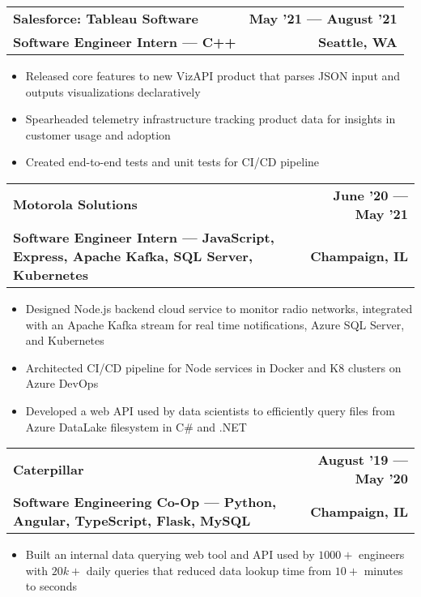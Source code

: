\documentclass[letterpaper,11pt]{article}
\makeatletter
\newcommand{\resumeItem}[1]{
  \item\small{
    {#1 \vspace{-1pt}}
  }
}
\newcommand{\resumeSubheadingSmall}[4]{
  \vspace{-0pt}
  \item
    \begin{tabular*}{1\textwidth}[t]{l@{\extracolsep{\fill}}r}
      \large{\textbf{#1}} & \small{\color{main}\textbf{#2}} \\
      \color{secondary}\textbf{\footnotesize#3} & \color{secondary}\textbf{\footnotesize#4} \\
    \end{tabular*}\vspace{-7pt}
}
\newcommand{\resumeSubSubheading}[2]{
    \item
    \begin{tabular*}{0.97\textwidth}{l@{\extracolsep{\fill}}r}
      \textit{\small#1} & \textit{\small #2} \\
    \end{tabular*}\vspace{-7pt}
}
\newcommand{\resumeSubHeadingListEnd}{\end{itemize}}
\newcommand{\resumeItemListStart}{\begin{itemize}}
\newcommand{\resumeItemListEnd}{\end{itemize}\vspace{0pt}}
\makeatother
\begin{document}
    \resumeSubheadingSmall
      {Salesforce: Tableau Software} %
      {May '21 --- August '21} %
      {Software Engineer Intern --- C++} %
      {Seattle, WA} %
      \resumeItemListStart
        \resumeItem{Released core features to new VizAPI product that parses JSON input and outputs visualizations declaratively}
        \resumeItem{Spearheaded telemetry infrastructure tracking product data for insights in customer usage and adoption}
        \resumeItem{Created end-to-end tests and unit tests for CI/CD pipeline}
      \resumeItemListEnd
      

    \resumeSubheadingSmall
      {Motorola Solutions} %
      {June '20 --- May '21} %
      {Software Engineer Intern --- JavaScript, Express, Apache Kafka, SQL Server, Kubernetes} %
      {Champaign, IL} %
      \resumeItemListStart
        \resumeItem{Designed Node.js backend cloud service to monitor radio networks, integrated with an Apache Kafka stream for real time notifications, Azure SQL Server, and Kubernetes }
        \resumeItem{Architected CI/CD pipeline for Node services in Docker and K8 clusters on Azure DevOps}
        \resumeItem{Developed a web API used by data scientists to efficiently query files from Azure DataLake filesystem in C\# and .NET}
    \resumeItemListEnd

    \resumeSubheadingSmall
      {Caterpillar} %
      {August '19 --- May '20} %
      {Software Engineering Co-Op --- Python, Angular, TypeScript, Flask, MySQL} %
      {Champaign, IL} %
      \resumeItemListStart
        \resumeItem{Built an internal data querying web tool and API used by $1000+$ engineers with $20k+$ daily queries that reduced data lookup time from $10+$ minutes to seconds}
      \resumeItemListEnd

\end{document}
